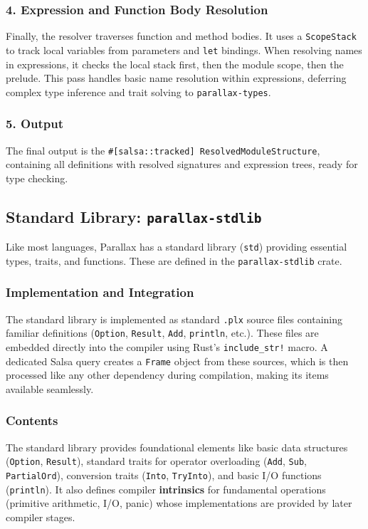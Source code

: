 \subsubsection{4. Expression and Function Body Resolution}
Finally, the resolver traverses function and method bodies. It uses a \texttt{ScopeStack} to track local variables from parameters and \texttt{let} bindings. When resolving names in expressions, it checks the local stack first, then the module scope, then the prelude. This pass handles basic name resolution within expressions, deferring complex type inference and trait solving to \texttt{parallax-types}.

\subsubsection{5. Output}

The final output is the \texttt{\#[salsa::tracked] ResolvedModuleStructure}, containing all definitions with resolved signatures and expression trees, ready for type checking.

\subsection{Standard Library: \texttt{parallax-stdlib}}

Like most languages, Parallax has a standard library (\texttt{std}) providing essential types, traits, and functions. These are defined in the \texttt{parallax-stdlib} crate.

\subsubsection{Implementation and Integration}

The standard library is implemented as standard \texttt{.plx} source files containing familiar definitions (\texttt{Option}, \texttt{Result}, \texttt{Add}, \texttt{println}, etc.). These files are embedded directly into the compiler using Rust's \texttt{include\_str!} macro. A dedicated Salsa query creates a \texttt{Frame} object from these sources, which is then processed like any other dependency during compilation, making its items available seamlessly.

\subsubsection{Contents}

The standard library provides foundational elements like basic data structures (\texttt{Option}, \texttt{Result}), standard traits for operator overloading (\texttt{Add}, \texttt{Sub}, \texttt{PartialOrd}), conversion traits (\texttt{Into}, \texttt{TryInto}), and basic I/O functions (\texttt{println}). It also defines compiler \textbf{intrinsics} for fundamental operations (primitive arithmetic, I/O, panic) whose implementations are provided by later compiler stages.

